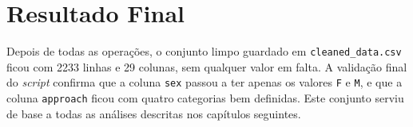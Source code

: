 \section{Resultado Final}
Depois de todas as operações, o conjunto limpo guardado em \texttt{cleaned\_data.csv} ficou com 2233 linhas e 29 colunas, sem qualquer valor em falta. A validação final do \textit{script} confirma que a coluna \texttt{sex} passou a ter apenas os valores \texttt{F} e \texttt{M}, e que a coluna \texttt{approach} ficou com quatro categorias bem definidas. Este conjunto serviu de base a todas as análises descritas nos capítulos seguintes.
